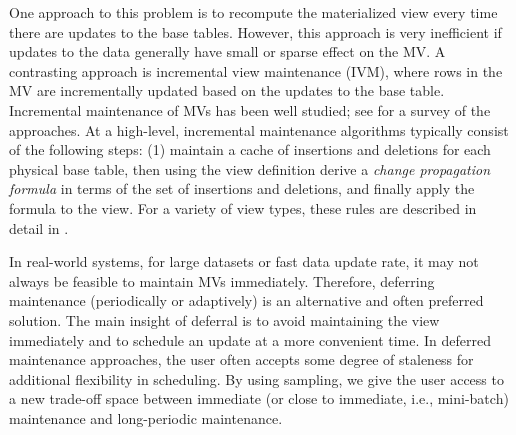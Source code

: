 One approach to this problem is to recompute the materialized view every time there are updates to the base tables.
However, this approach is very inefficient if updates to the data generally have small or sparse effect on the MV. 
A contrasting approach is incremental view maintenance (IVM), where rows in the MV are incrementally updated based on the updates to the base table.
Incremental maintenance of MVs has been well studied; see \cite{chirkova2011materialized} for a survey of the approaches. 
At a high-level, incremental maintenance algorithms typically consist of the following steps: (1) maintain a cache of insertions and deletions for each physical base table, then using the view definition derive a \emph{change propagation formula} in terms of the set of insertions and deletions, and finally apply the formula to the view.
For a variety of view types, these rules are described in detail in \cite{DBLP:journals/vldb/KochAKNNLS14, DBLP:conf/pods/Koch10}.


In real-world systems, for large datasets or fast data update rate, it may not always be feasible to maintain MVs immediately. 
Therefore, deferring maintenance (periodically or adaptively) is an alternative and often preferred solution.
The main insight of deferral is to avoid maintaining the view immediately and to schedule an update at a more convenient time.
In deferred maintenance approaches, the user often accepts some degree of staleness for additional flexibility in scheduling.
By using sampling, we give the user access to a new trade-off space between immediate (or close to immediate, i.e., mini-batch) maintenance and long-periodic maintenance.

\fi


